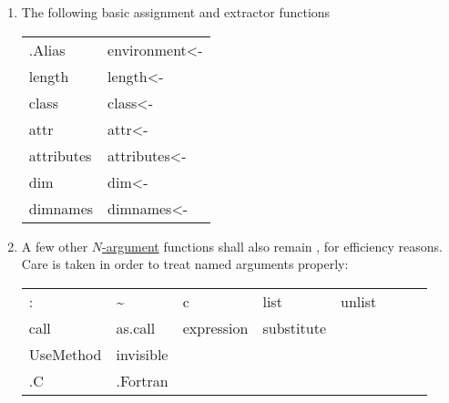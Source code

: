 \begin{enumerate}
\item The following basic assignment and extractor functions
  \begin{center}\ttfamily
    \begin{tabular}{ll}
      .Alias & environment<- \\
      length & length<- \\
      class  & class<-  \\
        attr & attr<- \\
   attributes& attributes<- \\
      dim    & dim<- \\
    dimnames & dimnames<- \\
    \end{tabular}
  \end{center}

\item A few other \underline{$N$-argument} functions shall also remain
  \primfun, for efficiency reasons.
  Care is taken in order to treat named arguments properly:
  \begin{center}\ttfamily
    \begin{tabular}{*{8}{l}}
      :    & \~ & c & list & unlist \\
      call & as.call & expression & substitute \\
      UseMethod & invisible \\
      .C & .Fortran
    \end{tabular}
  \end{center}

\end{enumerate}

